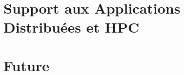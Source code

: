 \documentclass[a4paper]{book}
\begin{document}

\section{Support aux Applications Distribuées et HPC}


\section{Future}



\end{document}
